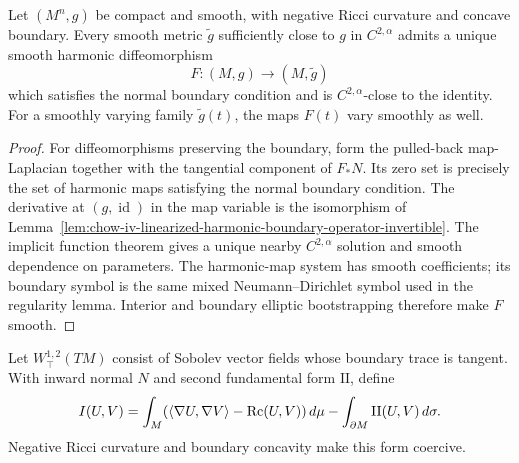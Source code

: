 \begin{proposition}
\label{prop:chow-iv-harmonic-diffeomorphism-negative-ricci}
Let \((M^n,g)\) be compact and smooth, with negative Ricci curvature and
concave boundary.  Every smooth metric \(\widetilde g\) sufficiently close to
\(g\) in \(C^{2,\alpha}\) admits a unique smooth harmonic diffeomorphism
\[
 F:(M,g)\longrightarrow(M,\widetilde g)
\]
which satisfies the normal boundary condition and is \(C^{2,\alpha}\)-close to
the identity.  For a smoothly varying family \(\widetilde g(t)\), the maps
\(F(t)\) vary smoothly as well.
\end{proposition}
\begin{proof}
For diffeomorphisms preserving the boundary, form the pulled-back
map-Laplacian together with the tangential component of \(F_*N\).  Its zero set
is precisely the set of harmonic maps satisfying the normal boundary
condition.  The derivative at \((g,\operatorname{id})\) in the map variable is
the isomorphism of Lemma~\ref{lem:chow-iv-linearized-harmonic-boundary-operator-invertible}.
The implicit function theorem gives a unique nearby \(C^{2,\alpha}\) solution
and smooth dependence on parameters.  The harmonic-map system has smooth
coefficients; its boundary symbol is the same mixed Neumann--Dirichlet symbol
used in the regularity lemma.  Interior and boundary elliptic bootstrapping
therefore make \(F\) smooth.
\end{proof}

Let \(W^{1,2}_{\top}(TM)\) consist of Sobolev vector fields whose boundary
trace is tangent.  With inward normal \(N\) and second fundamental form
\(\mathrm{II}\), define
\[
 I(U,V)=\int_M(\langle\nabla U,\nabla V\rangle-\operatorname{Rc}(U,V))\,d\mu
 -\int_{\partial M}\mathrm{II}(U,V)\,d\sigma.
\]
Negative Ricci curvature and boundary concavity make this form coercive.

